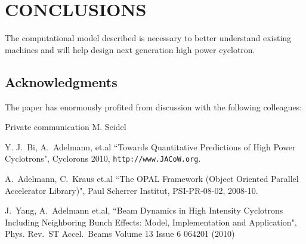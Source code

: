 \documentclass{JAC2003}
\begin{document}
\section{CONCLUSIONS}
The computational model described is necessary to better understand existing machines and will help
design next generation high power cyclotron.
\subsection{Acknowledgments}
The paper has enormously profited from discussion with the following colleagues:  



\begin{thebibliography}{9}   %

 Private communication M. Seidel

 Y. J.\ Bi,  A.\ Adelmann, et.al ``Towards Quantitative Predictions of High Power Cyclotrons", Cyclorons 2010,  \texttt{http://www.JACoW.org}.

 A.\ Adelmann, C.\ Kraus et.al ``The OPAL Framework (Object Oriented Parallel Accelerator Library)", Paul Scherrer Institut, PSI-PR-08-02, 2008-10.

 J.\ Yang, A.\ Adelmann et.al, ``Beam Dynamics in High Intensity Cyclotrons Including Neighboring Bunch Effects: Model, Implementation and Application", 
Phys. Rev.\ ST Accel.\ Beams Volume 13 Issue 6 064201 (2010)


\end{thebibliography}
\end{document}
